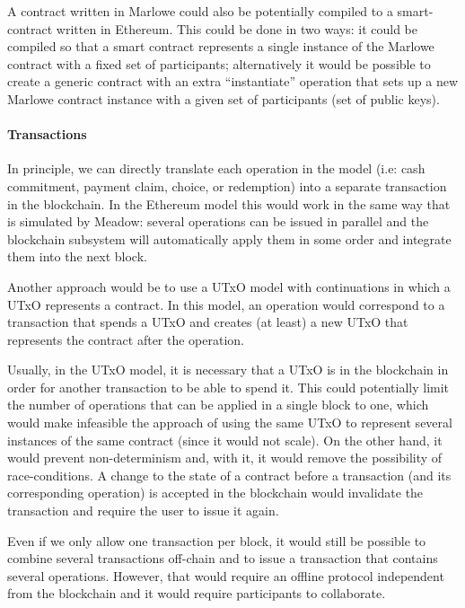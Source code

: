 \documentclass[runningheads]{llncs}
\begin{document}
A contract written in Marlowe could also be potentially
compiled to a smart-contract written in Ethereum. This could be done in two ways: it could be compiled so that a 
smart contract represents a single instance of the Marlowe contract with a fixed set of participants; 
alternatively it would be possible to create a generic contract with an extra ``instantiate'' operation that 
sets up a new Marlowe contract instance with a given set of participants (set of public keys).

\paragraph{Transactions}

In principle, we can directly translate each operation in the model (i.e: cash commitment, payment claim, choice, or
redemption) into a separate transaction in the blockchain. In the Ethereum model this would work in the same 
way that is simulated by Meadow: several operations can be issued in parallel and the blockchain subsystem will 
automatically apply them in some order and integrate them into the next block.

Another approach would be to use a UTxO model with continuations in which a UTxO represents a contract. In this model,
an operation would correspond to a transaction that spends a UTxO and creates (at least) a new UTxO that represents the 
contract after the operation.

Usually, in the UTxO model, it is necessary that a UTxO is in the blockchain in order for another transaction to be 
able to spend it. This could potentially limit the number of operations that can be applied in a single block to one, 
which would make infeasible the approach of using the same UTxO to represent several instances of the same contract 
(since it would not scale).
On the other hand, it would prevent non-determinism and, with it, it would remove the possibility of race-conditions. A 
change to the state of a contract before a transaction (and its corresponding operation) is accepted in the blockchain 
would invalidate the transaction and require the user to issue it again.

Even if we only allow one transaction per block, it would still be possible to combine several transactions off-chain 
and to issue a transaction that contains several operations. However, that would require an offline protocol 
independent from the blockchain and it would require participants to collaborate.
\end{document}
